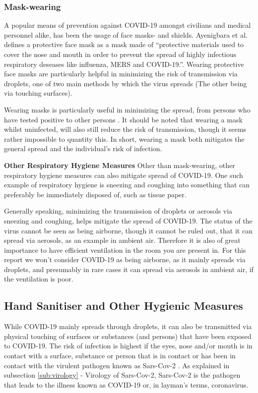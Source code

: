 \subsubsection{Mask-wearing}
A popular means of prevention against COVID-19 amongst civilians and medical personnel alike, has been the usage of face masks- and shields. Ayenigbara et al. defines a protective face mask as a mask made of ``protective materials used to cover the nose and mouth in order to prevent the spread of highly infectious respiratory deseases like influenza, MERS and COVID-19.''\citep{ayenigbara_covid-19_2020}. Wearing protective face masks are particularly helpful in minimizing the risk of transmission via droplets, one of two main methods by which the virus spreads (The other being via touching surfaces).

Wearing masks is particularly useful in minimizing the spread, from persons who have tested positive to other persons \citep{ayenigbara_covid-19_2020}. It should be noted that wearing a mask whilst uninfected, will also still reduce the risk of transmission, though it seems rather impossible to quantity this. In short, wearing a mask both mitigates the general spread and the individual's risk of infection.

\textbf{Other Respiratory Hygiene Measures}
Other than mask-wearing, other respiratory hygiene measures can also mitigate spread of COVID-19. One such example of respiratory hygiene is sneezing and coughing into something that can preferably be immediately disposed of, such as tissue paper. 

Generally speaking, minimizing the transmission of droplets or aerosols via sneezing and coughing, helps mitigate the spread of COVID-19. The status of the virus cannot be seen as being airborne, though it cannot be ruled out, that it can spread via aerosols, as an example in ambient air. Therefore it is also of great importance to have efficient ventilation in the room you are present in. For this report we won't consider COVID-19 as being airborne, as it mainly spreads via droplets, and presumably in rare cases it can spread via aerosols in ambient air, if the ventilation is poor.


\subsection{Hand Sanitiser and Other Hygienic Measures}
While COVID-19 mainly spreads through droplets, it can also be transmitted via physical touching of surfaces or substances (and persons) that have been exposed to COVID-19. The risk of infection is highest if the eyes, nose and/or mouth is in contact with a surface, substance or person that is in contact or has been in contact with the virulent pathogen known as Sars-Cov-2 \citep{ayenigbara_covid-19_2020}. As explained in subsection \ref{sub:virology} - Virology of Sars-Cov-2, Sars-Cov-2 is the pathogen that leads to the illness known as COVID-19 or, in layman's terms, coronavirus.

